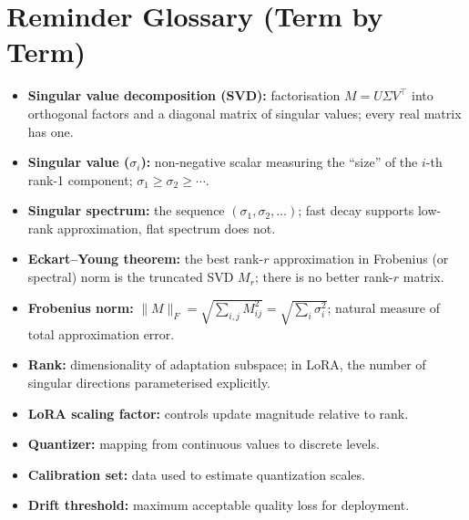 \section*{Reminder Glossary (Term by Term)}
\begin{itemize}[leftmargin=1.5em]
  \item \textbf{Singular value decomposition (SVD):} factorisation $M = U\Sigma V^\top$ into orthogonal factors and a diagonal matrix of singular values; every real matrix has one.
  \item \textbf{Singular value ($\sigma_i$):} non-negative scalar measuring the ``size'' of the $i$-th rank-1 component; $\sigma_1 \ge \sigma_2 \ge \cdots$.
  \item \textbf{Singular spectrum:} the sequence $(\sigma_1, \sigma_2, \ldots)$; fast decay supports low-rank approximation, flat spectrum does not.
  \item \textbf{Eckart--Young theorem:} the best rank-$r$ approximation in Frobenius (or spectral) norm is the truncated SVD $M_r$; there is no better rank-$r$ matrix.
  \item \textbf{Frobenius norm:} $\|M\|_F = \sqrt{\sum_{i,j}M_{ij}^2} = \sqrt{\sum_i \sigma_i^2}$; natural measure of total approximation error.
  \item \textbf{Rank:} dimensionality of adaptation subspace; in LoRA, the number of singular directions parameterised explicitly.
  \item \textbf{LoRA scaling factor:} controls update magnitude relative to rank.
  \item \textbf{Quantizer:} mapping from continuous values to discrete levels.
  \item \textbf{Calibration set:} data used to estimate quantization scales.
  \item \textbf{Drift threshold:} maximum acceptable quality loss for deployment.
\end{itemize}


